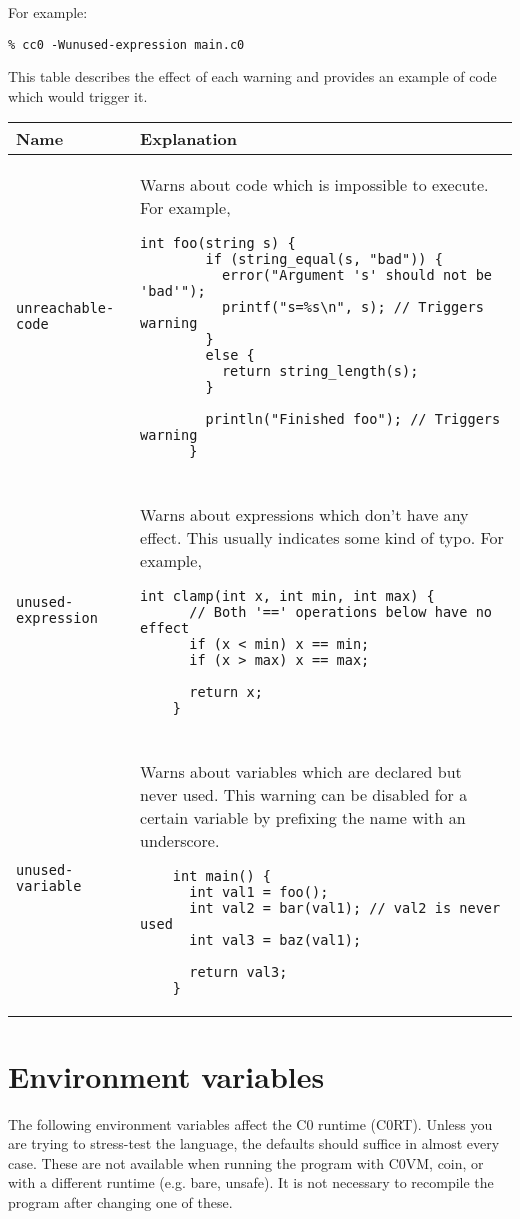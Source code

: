 \documentclass[11pt]{article}
\begin{document}
For example:
\begin{lstlisting}
% cc0 -Wunused-expression main.c0 
\end{lstlisting}

This table describes the effect of each warning and provides an example of code which would trigger it.

\begin{center}
  \begin{longtable}{lp{7cm}}
    Name & Explanation \\
    \hline
    \rule{0pt}{\normalbaselineskip}
    \texttt{unreachable-code} & Warns about code which is impossible to execute. For example, 
    \begin{lstlisting}[xleftmargin=-\leftmargini]
      int foo(string s) {
        if (string_equal(s, "bad")) {
          error("Argument 's' should not be 'bad'");
          printf("s=%s\n", s); // Triggers warning
        }
        else {
          return string_length(s);
        }

        println("Finished foo"); // Triggers warning
      }
    \end{lstlisting} \\
    \\
    \texttt{unused-expression} & Warns about expressions which don't have any effect. This usually indicates some kind of typo. For example,
    \begin{lstlisting}[xleftmargin=-\leftmargini]
    int clamp(int x, int min, int max) {
      // Both '==' operations below have no effect
      if (x < min) x == min;
      if (x > max) x == max; 

      return x;
    }
    \end{lstlisting} \\
    \\
    \texttt{unused-variable} & Warns about variables which are declared but never used. This warning can be disabled for a certain variable by prefixing the name with an underscore.
    \begin{lstlisting}
    int main() {
      int val1 = foo();
      int val2 = bar(val1); // val2 is never used
      int val3 = baz(val1);
      
      return val3;
    }
    \end{lstlisting}
  \end{longtable}
\end{center}
  

\section{Environment variables}
The following environment variables affect the C0 runtime (C0RT). Unless you are trying to stress-test the language, the defaults should suffice in almost every case. These are not available when running the program with C0VM, coin, or with a different runtime (e.g. bare, unsafe). It is not necessary to recompile the program after changing one of these. 
\end{document}
